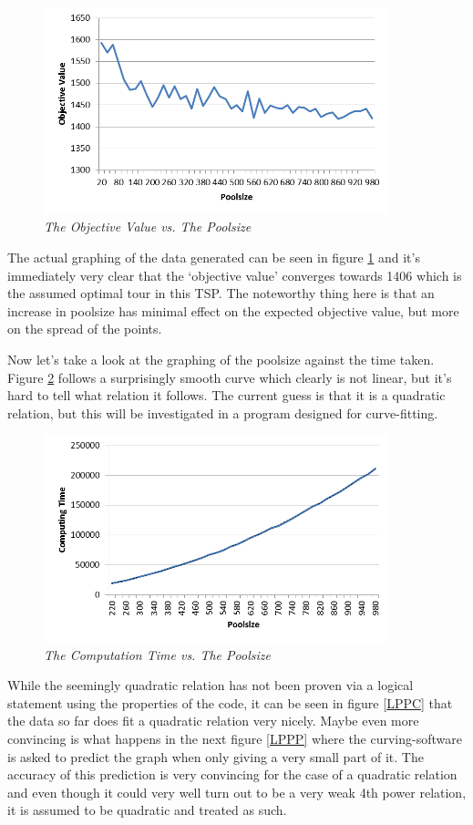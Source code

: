 \begin{figure}[H] 
\centering
\includegraphics[height=6cm]{OVP}
\caption{\textsl{The Objective Value vs. The Poolsize}}
\label{OVP}
\end{figure}

The actual graphing of the data generated can be seen in figure \ref{OVP} and it’s immediately very clear that the ‘objective value’ converges towards 1406 which is the assumed optimal tour in this TSP. The noteworthy thing here is that an increase in poolsize has minimal effect on the expected objective value, but more on the spread of the points.

\par
Now let’s take a look at the graphing of the poolsize against the time taken. 
Figure \ref{CTP} follows a surprisingly smooth curve which clearly is not linear, but it’s hard to tell what relation it follows. The current guess is that it is a quadratic relation, but this will be investigated in a program designed for curve-fitting.

\begin{figure}[H] 
	\centering
	\includegraphics[height=6cm]{CTP}
	\caption{\textsl{The Computation Time vs. The Poolsize}}
	\label{CTP}
\end{figure}

\noindent
While the seemingly quadratic relation has not been proven via a logical statement using the properties of the code, it can be seen in figure \ref{LPPC} that the data so far does fit a quadratic relation very nicely. Maybe even more convincing is what happens in the next figure \ref{LPPP} where the curving-software is asked to predict the graph when only giving a very small part of it. The accuracy of this prediction is very convincing for the case of a quadratic relation and even though it could very well turn out to be a very weak 4th power relation, it is assumed to be quadratic and treated as such.

